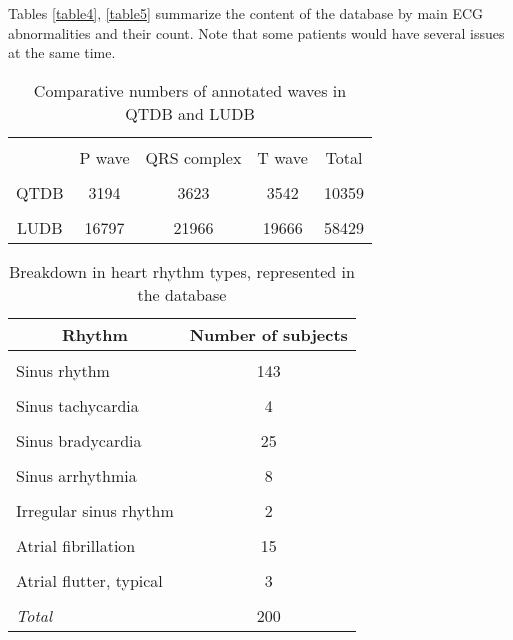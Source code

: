 \documentclass[submitted]{ieeeaccess}
\newcommand{\NewCorrection}[1]{{#1}}
\begin{document}
Tables \ref{table4}, \ref{table5} summarize the content of the database by main ECG abnormalities and their count. Note that some patients would have several issues at the same time.

\begin{table}
\centering
		\caption{Comparative numbers of annotated waves in QTDB and LUDB}
		\medskip
		
		\begin{tabular}{|c|c|c|c|c|}
			\hline
			&&&&\\[-1em]
			& {P wave} & {QRS complex} & {T wave} & {Total} \\
			\hline
			&&&&\\[-1em]
			QTDB & 3194 & 3623 & 3542 & 10359 \\
			\hline
			&&&&\\[-1em]
			LUDB & 16797 & 21966 & 19666 & 58429 \\
			\hline
		\end{tabular}
		\label{table1}
\end{table}



\begin{table}
\centering
		\caption{Breakdown in heart rhythm types, represented in the database}
		\medskip
		\begin{tabular}{|l|c|}
			\hline
			\multicolumn{1}{c|}{Rhythm} & {Number of subjects} \\
			\hline
			&\\[-1em]
			Sinus rhythm & 143 \\
			\hline
			&\\[-1em]
			Sinus tachycardia & 4 \\
			\hline
			&\\[-1em]
			Sinus bradycardia & 25 \\
			\hline
			&\\[-1em]
			Sinus arrhythmia & 8 \\
			\hline
			&\\[-1em]
			Irregular sinus rhythm & 2 \\
			\hline
			&\\[-1em]
			\NewCorrection{Atrial fibrillation}	 & \NewCorrection{15} \\
			\hline
			&\\[-1em]
			\NewCorrection{Atrial flutter, typical}	 & \NewCorrection{3} \\
			\hline
			&\\[-1em]
			{\it Total} & 200\\
			\hline
		\end{tabular}
		\label{table2}
\end{table}
\end{document}

